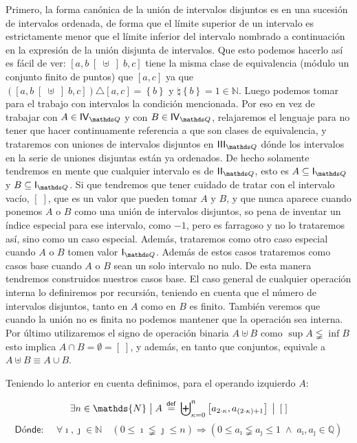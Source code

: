 \documentclass[final,12pt,a4paper,twoside,fleqn]{extbook}
\newcommand{\sthen}{\ensuremath{\Longrightarrow}}
\newcommand{\mathdef}{\ensuremath{\stackrel{\mathsf{def}}{{}={}}}}
\newcommand{\then}{\ensuremath{\sthen}}
\newcommand{\set}[1]{\ensuremath{\left\lbrace{#1}\right\rbrace}}
\newcommand{\setN}{\ensuremath{\mathds{N}}}
\newcommand{\setQ}{\ensuremath{\mathds{Q}}}
\theoremstyle{definition}
\theoremstyle{remark}
\begin{document}
	Primero, la forma canónica de la unión de intervalos disjuntos es en una
sucesión de intervalos ordenada, de forma que el límite superior de un
intervalo es estrictamente menor que el límite inferior del intervalo
nombrado a continuación en la expresión de la unión disjunta de intervalos.
Que esto podemos hacerlo así es fácil de ver: \(\left[ a , b \right[ \uplus
\left] b , c \right] \) tiene la misma clase de equivalencia (módulo un
conjunto finito de puntos) que \( \left[ a , c \right] \) ya que \( \left(
\left[ a , b \right[ \uplus \left] b , c \right] \right) \triangle \left[ a ,
c \right] = \set{b}\) y \( \natural\set{b} = 1 \in \setN \). Luego podemos
tomar para el trabajo con intervalos la condición mencionada. Por eso en vez
de trabajar con \( A \in \IVQ \) y con \( B \in \IVQ \), relajaremos el
lenguaje para no tener que hacer continuamente referencia a que son clases de
equivalencia, y trataremos con uniones de intervalos disjuntos en \( \IIIQ \)
dónde los intervalos en la serie de uniones disjuntas están ya ordenados. De
hecho solamente tendremos en mente que cualquier intervalo es de \( \IIQ \),
esto es \( A \subseteq \IQ \) y \( B \subseteq \IQ \). Si que tendremos que
tener cuidado de tratar con el intervalo vacío, \( \left[{\;}\right] \), que
es un valor que pueden tomar \(A\) y \(B\), y que nunca aparece cuando
ponemos \(A\) o \(B\) como una unión de intervalos disjuntos, so pena de
inventar un índice especial para ese intervalo, como \(-1\), pero es
farragoso y no lo trataremos así, sino como un caso especial. Además,
trataremos como otro caso especial cuando \(A\) o \(B\) tomen valor \(\IQ\).
Además de estos casos trataremos como casos base cuando \(A\) o \(B\) sean un
solo intervalo no nulo. De esta manera tendremos construidos nuestros casos
base. El caso general de cualquier operación interna lo definiremos por
recursión, teniendo en cuenta que el número de intervalos disjuntos, tanto en
\(A\) como en \(B\) es finito. También veremos que cuando la unión no es
finita no podemos mantener que la operación sea interna. Por último
utilizaremos el signo de operación binaria \(A \uplus B\) como \( \sup A
\lneqq \inf B \) esto implica \( A \cap B = \emptyset = \left[\;\right] \), y
además, en tanto que conjuntos, equivale a \( A \uplus B \equiv A \cup B \).



	Teniendo lo anterior en cuenta definimos, para el operando izquierdo
\(A\):



\begin{equation}
\exists n \in \setN \;\big{|}\; A \mathdef
\displaystyle{{\biguplus}_{\kappa=0}^{n}} \left[ a_{ 2 \cdot \kappa}, a_{ {
\left( 2 \cdot \kappa \right) } + 1 } \right] \; \bf{ \big{ | } } \; \left[
\; \right]
\end{equation}
\begin{equation}
\textsf{Dónde:    }\quad \forall \imath,\jmath \in \setN \quad \left( 0 \leq
\imath \lneqq \jmath \leq n \right) \then \left( 0 \leq a_{\imath} \lneqq
a_{\jmath} \leq 1\;  \land \; a_{\imath}, a_{\jmath}\in \setQ \right)
\end{equation}
\end{document}
